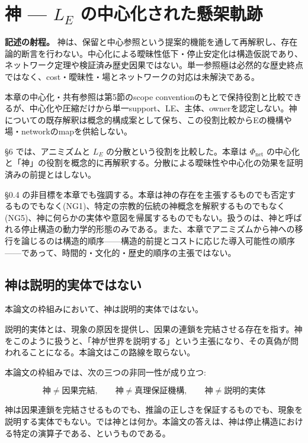 \section{神 — $L_E$ の中心化された懸架軌跡}

\noindent\textbf{記述の射程。} 神は、保留と中心参照という提案的機能を通して再解釈し、存在論的断言を行わない。中心化による曖昧性低下・停止安定化は構造仮説であり、ネットワーク定理や検証済み歴史因果ではない。単一参照極は必然的な歴史終点ではなく、cost・曖昧性・場とネットワークの対応は未解決である。

本章の中心化・共有参照は第5節のscope conventionのもとで保持役割と比較できるが、中心化や圧縮だけから単一support、LE、主体、ownerを認定しない。神についての既存解釈は概念的構成案として保ち、この役割比較からEの機構や場・networkのmapを供給しない。



\S{}6 では、アニミズムと $L_E$ の分散という役割を比較した。本章は $\Phi_{\text{net}}$ の中心化と「神」の役割を概念的に再解釈する。分散による曖昧性や中心化の効果を証明済みの前提とはしない。

\S{}0.4 の非目標を本章でも強調する。本章は神の存在を主張するものでも否定するものでもなく(NG1)、特定の宗教的伝統の神概念を解釈するものでもなく(NG5)、神に何らかの実体や意図を帰属するものでもない。扱うのは、神と呼ばれる停止構造の動力学的形態のみである。また、本章でアニミズムから神への移行を論じるのは構造的順序——構造的前提とコストに応じた導入可能性の順序——であって、時間的・文化的・歴史的順序の主張ではない。

\bigskip


\subsection{神は説明的実体ではない}


本論文の枠組みにおいて、神は説明的実体ではない。

説明的実体とは、現象の原因を提供し、因果の連鎖を完結させる存在を指す。神をこのように扱うと、「神が世界を説明する」という主張になり、その真偽が問われることになる。本論文はこの路線を取らない。

本論文の枠組みでは、次の三つの非同一性が成り立つ:

\[
\text{神} \neq \text{因果完結}, \qquad \text{神} \neq \text{真理保証機構}, \qquad \text{神} \neq \text{説明的実体}
\]

神は因果連鎖を完結させるものでも、推論の正しさを保証するものでも、現象を説明する実体でもない。では神とは何か。本論文の答えは、神は停止構造における特定の演算子である、というものである。

